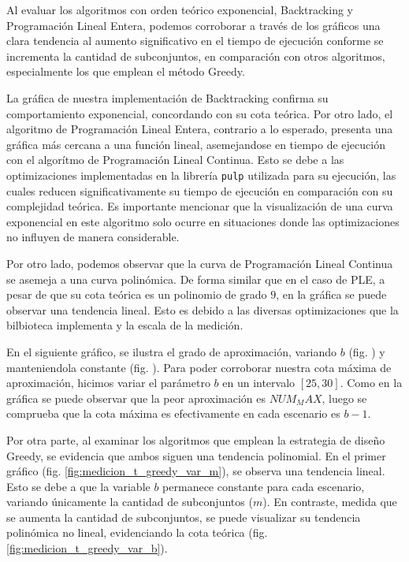 Al evaluar los algoritmos con orden teórico exponencial, Backtracking y Programación Lineal Entera, podemos corroborar a través de los gráficos una clara tendencia al aumento significativo en el tiempo de ejecución conforme se incrementa la cantidad de subconjuntos, en comparación con otros algoritmos, especialmente los que emplean el método Greedy.

La gráfica de nuestra implementación de Backtracking confirma su comportamiento exponencial, concordando con su cota teórica. Por otro lado, el algoritmo de Programación Lineal Entera, contrario a lo esperado, presenta una gráfica más cercana a una función lineal, asemejandose en tiempo de ejecución con el algorítmo de Programación Lineal Continua. Esto se debe a las optimizaciones implementadas en la librería \texttt{pulp} utilizada para su ejecución, las cuales reducen significativamente su tiempo de ejecución en comparación con su complejidad teórica. Es importante mencionar que la visualización de una curva exponencial en este algoritmo solo ocurre en situaciones donde las optimizaciones no influyen de manera considerable.

Por otro lado, podemos observar que la curva de Programación Lineal Continua se asemeja a una curva polinómica. De forma similar que en el caso de PLE, a pesar de que su cota teórica es un polinomio de grado $9$, en la gráfica se puede observar una tendencia lineal. Esto es debido a las diversas optimizaciones que la bilbioteca implementa y la escala de la medición.

En el siguiente gráfico, se ilustra el grado de aproximación, variando $b$ (fig. \label{medicion-plc-var-b}) y manteniendola constante (fig. \label{medicion-plc-cons-b}). Para poder corroborar nuestra cota máxima de aproximación, hicimos variar el parámetro $b$ en un intervalo $\left[25,30\right]$. Como en la gráfica se puede observar que la peor aproximación es $NUM_MAX$, luego se comprueba que la cota máxima es efectivamente en cada escenario es $b-1$.

Por otra parte, al examinar los algoritmos que emplean la estrategia de diseño Greedy, se evidencia que ambos siguen una tendencia polinomial. En el primer gráfico (fig. \ref{fig:medicion_t_greedy_var_m}), se observa una tendencia lineal. Esto se debe a que la variable $b$ permanece constante para cada escenario, variando únicamente la cantidad de subconjuntos ($m$). En contraste, medida que se aumenta la cantidad de subconjuntos, se puede visualizar su tendencia polinómica no lineal, evidenciando la cota teórica (fig. \ref{fig:medicion_t_greedy_var_b}).

